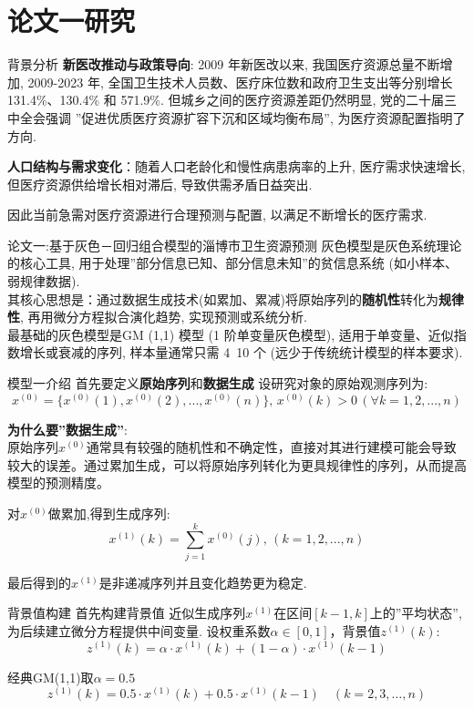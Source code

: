 \documentclass{beamer}
\begin{document}
    \section{论文一研究}

    \begin{frame}{背景分析} 
        \qquad \textbf{新医改推动与政策导向}: 2009 年新医改以来, 我国医疗资源总量不断增加, 2009-2023 年, 全国卫生技术人员数、医疗床位数和政府卫生支出等分别增长 131.4\%、130.4\% 和 571.9\%. 但城乡之间的医疗资源差距仍然明显, 党的二十届三中全会强调 ''促进优质医疗资源扩容下沉和区域均衡布局'', 为医疗资源配置指明了方向. 

        \qquad\textbf{人口结构与需求变化}：随着人口老龄化和慢性病患病率的上升, 医疗需求快速增长, 但医疗资源供给增长相对滞后, 导致供需矛盾日益突出. 

        \qquad 因此当前急需对医疗资源进行合理预测与配置, 以满足不断增长的医疗需求. 
    \end{frame}
    \begin{frame}{论文一:基于灰色－回归组合模型的淄博市卫生资源预测}
        \qquad 灰色模型是灰色系统理论的核心工具, 用于处理''部分信息已知、部分信息未知''的贫信息系统 (如小样本、弱规律数据).\\
        \qquad 其核心思想是：通过数据生成技术(如累加、累减)将原始序列的\textbf{随机性}转化为\textbf{规律性}, 再用微分方程拟合演化趋势, 实现预测或系统分析. \\
        \qquad 最基础的灰色模型是GM (1,1) 模型 (1 阶单变量灰色模型), 适用于单变量、近似指数增长或衰减的序列, 样本量通常只需 4~10 个 (远少于传统统计模型的样本要求). 
    \end{frame}
    \begin{frame}{模型一介绍}
        \qquad 首先要定义\textbf{原始序列}和\textbf{数据生成}
        设研究对象的原始观测序列为:
        \[x^{(0)}=\{x^{(0)}(1),x^{(0)}(2),...,x^{(0)}(n)\},\, x^{(0)}(k)>0 \,(\forall k=1,2,...,n)\]
        
        \textbf{为什么要''数据生成''}:\\
        \qquad 原始序列$x^{(0)}$通常具有较强的随机性和不确定性，直接对其进行建模可能会导致较大的误差。通过累加生成，可以将原始序列转化为更具规律性的序列，从而提高模型的预测精度。
        
        \qquad 对$x^{(0)}$做累加,得到生成序列: $$x^{(1)}(k)=\sum_{j=1}^{k}x^{(0)}(j),\, (k=1,2,...,n)$$
        
        \qquad 最后得到的$x^{(1)}$是非递减序列并且变化趋势更为稳定.
    \end{frame}
    \begin{frame}{背景值构建}
        \qquad 首先构建背景值
        近似生成序列$x^{(1)}$在区间$[k-1, k]$上的''平均状态'', 为后续建立微分方程提供中间变量. 
        设权重系数$\alpha \in [0,1]$，背景值$z^{(1)}(k)$: 
        \[
        z^{(1)}(k) = \alpha \cdot x^{(1)}(k) + (1-\alpha) \cdot x^{(1)}(k-1)
        \]
        \begin{block}{经典GM(1,1)取$\alpha=0.5$}
            \[
            z^{(1)}(k) = 0.5 \cdot x^{(1)}(k) + 0.5 \cdot x^{(1)}(k-1) \quad (k=2,3,\dots,n)
            \]
        \end{block}
    \end{frame}
\end{document}
